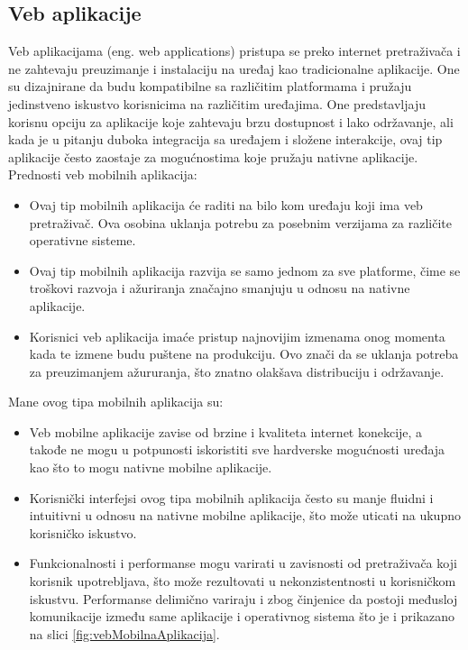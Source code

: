 \documentclass[12pt,oneside]{memoir}
\begin{document}
\subsection{Veb aplikacije}

Veb aplikacijama (eng. web applications) pristupa se preko internet pretraživača i ne zahtevaju preuzimanje i instalaciju na uređaj kao tradicionalne aplikacije. One su dizajnirane da budu kompatibilne sa različitim platformama i pružaju jedinstveno iskustvo korisnicima na različitim uređajima. One predstavljaju korisnu opciju za aplikacije koje zahtevaju brzu dostupnost i lako održavanje, ali kada je u pitanju duboka integracija sa uređajem i složene interakcije, ovaj tip aplikacije često zaostaje za mogućnostima koje pružaju nativne aplikacije. Prednosti veb mobilnih aplikacija:

\begin{itemize}
    \item Ovaj tip mobilnih aplikacija će raditi na bilo kom uređaju koji ima veb pretraživač. Ova osobina uklanja potrebu za posebnim verzijama za različite operativne sisteme.
    \item Ovaj tip mobilnih aplikacija razvija se samo jednom za sve platforme, čime se troškovi razvoja i ažuriranja značajno smanjuju u odnosu na nativne aplikacije.
    \item Korisnici veb aplikacija imaće pristup najnovijim izmenama onog momenta kada te izmene budu puštene na produkciju. Ovo znači da se uklanja potreba za preuzimanjem ažururanja, što znatno olakšava distribuciju i održavanje.
\end{itemize}
Mane ovog tipa mobilnih aplikacija su:
\begin{itemize}
    \item Veb mobilne aplikacije zavise od brzine i kvaliteta internet konekcije, a takođe ne mogu u potpunosti iskoristiti sve hardverske mogućnosti uređaja kao što to mogu nativne mobilne aplikacije.
    \item Korisnički interfejsi ovog tipa mobilnih aplikacija često su manje fluidni i intuitivni u odnosu na nativne mobilne aplikacije, što može uticati na ukupno korisničko iskustvo.
    \item Funkcionalnosti i performanse mogu varirati u zavisnosti od pretraživača koji korisnik upotrebljava, što može rezultovati u nekonzistentnosti u korisničkom iskustvu. Performanse delimično variraju i zbog činjenice da postoji međusloj komunikacije između same aplikacije i operativnog sistema što je i prikazano na slici \ref{fig:vebMobilnaAplikacija}.
\end{itemize}
\end{document}
